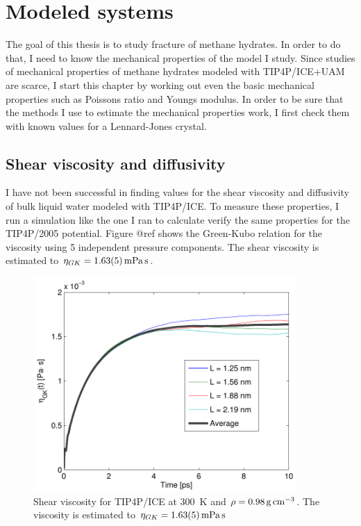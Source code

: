 
\chapter{Modeled systems}
The goal of this thesis is to study fracture of methane hydrates. In order to do that, I need to know the mechanical properties of the model I study. Since studies of mechanical properties of methane hydrates modeled with TIP4P/ICE+UAM are scarce, I start this chapter by working out even the basic mechanical properties such as Poissons ratio and Youngs modulus. In order to be sure that the methods I use to estimate the mechanical properties work, I first check them with known values for a Lennard-Jones crystal. 

\section{Shear viscosity and diffusivity}
I have not been successful in finding values for the shear viscosity and diffusivity of bulk liquid water modeled with TIP4P/ICE. To measure these properties, I run a simulation like the one I ran to calculate verify the same properties for the TIP4P/2005 potential. Figure @ref shows the Green-Kubo relation for the viscosity using 5 independent pressure components. The shear viscosity is estimated to $\eta_{GK} = \text{\SI{1.63\pm 0.05}{\milli\pascal\second}}$. 

\begin{figure}
\centering
\includegraphics[width=10cm]{../figures/thesis/viscosity_green_kubo_tip4p_ice.pdf}
\caption{Shear viscosity for TIP4P/ICE at \SI{300}{\kelvin} and $\rho = \text{\SI{0.98}{\gram\per\cubic\cm}}$. The viscosity is estimated to $\eta_{GK} = \text{\SI{1.63\pm0.05}{\milli\pascal\second}}$}
\end{figure}


